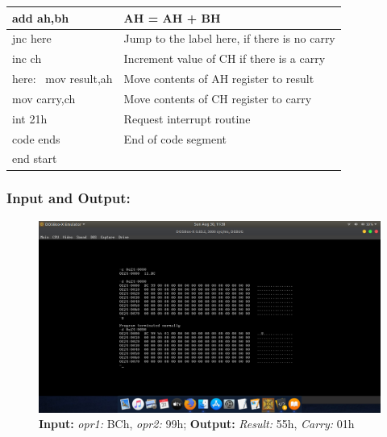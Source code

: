 \documentclass[12pt,a4paper]{article}
\begin{document}
\begin{flushleft}
\begin{table}[htb]
{\begin{tabular}{|l|l|}
\hline
add ah,bh                                                        & AH = AH + BH                                  \\ 
\hline
jnc here                                                         & Jump to the label here, if there is no carry  \\ 
\hline
inc ch                                                           & Increment value of CH if there is a carry     \\ 
\hline
here:~ mov result,ah                                             & Move contents of AH register to result        \\ 
\hline
mov carry,ch                                                     & Move contents of CH register to carry         \\ 
\hline
int 21h                                                          & Request interrupt routine                     \\ 
\hline
code ends                                                        & End of code segment                           \\
\hline
end start                                                        &                                               \\
\hline
\end{tabular}
}
\end{table}

\newpage
\subsubsection*{\textbf{Input and Output:}}
\begin{figure}[h]
    \centering
    \includegraphics[trim = 100mm 70mm 100mm 80mm, clip, width = \textwidth]{Pics/Addition.png}
    \caption{ \textbf{Input:} \emph{opr1:} BCh, \emph{opr2:} 99h; 
              \textbf{Output:} \emph{Result:} 55h, \emph{Carry:} 01h}
\end{figure}
\newpage

\end{flushleft}
\end{document}
